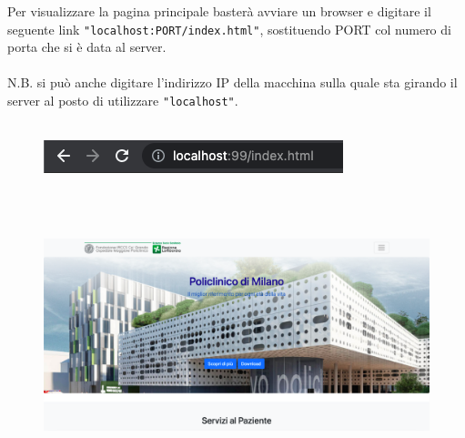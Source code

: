 \documentclass[a4paper,12pt]{report}
\begin{document}
Per visualizzare la pagina principale basterà avviare un browser e digitare il seguente link \texttt{"localhost:PORT/index.html"}, sostituendo PORT col numero di porta che si è data al server.
\\
\\
N.B. si può anche digitare l'indirizzo IP della macchina sulla quale sta girando il server al posto di utilizzare \texttt{"localhost"}.
\\
\\
\begin{figure}[ht]
    \begin{center}
        \centering
        \includegraphics[scale=.8]{img/Link.png}
    \end{center}
\end{figure}
\\
\\
\begin{figure}[ht]
    \begin{center}
        \centering
        \hspace*{-0.8in}
        \includegraphics[scale=.35]{img/Home.png}
    \end{center}
\end{figure}

\clearpage
\end{document}
